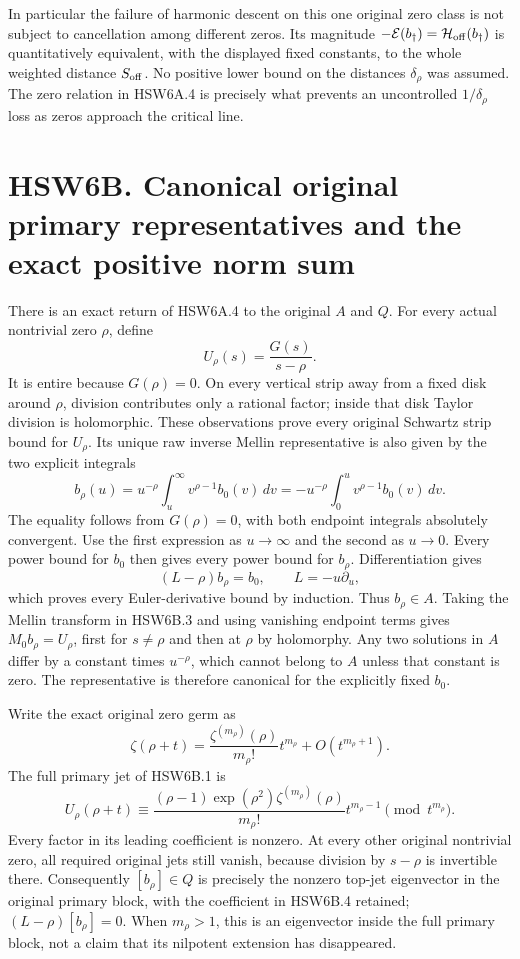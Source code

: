 In particular the failure of harmonic descent on this one original zero
class is not subject to cancellation among different zeros. Its
magnitude \(-\mathcal E(b_\dagger)=\mathcal H_{\rm off}(b_\dagger)\) is
quantitatively equivalent, with the displayed fixed constants, to the
whole weighted distance \(S_{\rm off}\). No positive lower bound on the
distances \(\delta_\rho\) was assumed. The zero relation in HSW6A.4 is
precisely what prevents an uncontrolled \(1/\delta_\rho\) loss as zeros
approach the critical line.

\section{HSW6B. Canonical original primary representatives and the exact
positive norm
sum}\label{hsw6b.-canonical-original-primary-representatives-and-the-exact-positive-norm-sum}

There is an exact return of HSW6A.4 to the original \(A\) and \(Q\). For
every actual nontrivial zero \(\rho\), define \[
U_\rho(s)=\frac{G(s)}{s-\rho}.
\tag{HSW6B.1}
\] It is entire because \(G(\rho)=0\). On every vertical strip away from
a fixed disk around \(\rho\), division contributes only a rational
factor; inside that disk Taylor division is holomorphic. These
observations prove every original Schwartz strip bound for \(U_\rho\).
Its unique raw inverse Mellin representative is also given by the two
explicit integrals \[
\boxed{
b_\rho(u)=u^{-\rho}\int_u^\infty v^{\rho-1}b_0(v)\,dv
=-u^{-\rho}\int_0^u v^{\rho-1}b_0(v)\,dv.}
\tag{HSW6B.2}
\] The equality follows from \(G(\rho)=0\), with both endpoint integrals
absolutely convergent. Use the first expression as \(u\to\infty\) and
the second as \(u\to0\). Every power bound for \(b_0\) then gives every
power bound for \(b_\rho\). Differentiation gives \[
(L-\rho)b_\rho=b_0,\qquad L=-u\partial_u,
\tag{HSW6B.3}
\] which proves every Euler-derivative bound by induction. Thus
\(b_\rho\in A\). Taking the Mellin transform in HSW6B.3 and using
vanishing endpoint terms gives \(M_0b_\rho=U_\rho\), first for
\(s\ne\rho\) and then at \(\rho\) by holomorphy. Any two solutions in
\(A\) differ by a constant times \(u^{-\rho}\), which cannot belong to
\(A\) unless that constant is zero. The representative is therefore
canonical for the explicitly fixed \(b_0\).

Write the exact original zero germ as \[
\zeta(\rho+t)=\frac{\zeta^{(m_\rho)}(\rho)}{m_\rho!}t^{m_\rho}
+O(t^{m_\rho+1}).
\] The full primary jet of HSW6B.1 is \[
U_\rho(\rho+t)\equiv
\frac{(\rho-1)\exp(\rho^2)\zeta^{(m_\rho)}(\rho)}{m_\rho!}
t^{m_\rho-1}
\pmod{t^{m_\rho}}.
\tag{HSW6B.4}
\] Every factor in its leading coefficient is nonzero. At every other
original nontrivial zero, all required original jets still vanish,
because division by \(s-\rho\) is invertible there. Consequently
\([b_\rho]\in Q\) is precisely the nonzero top-jet eigenvector in the
original primary block, with the coefficient in HSW6B.4 retained;
\((L-\rho)[b_\rho]=0\). When \(m_\rho>1\), this is an eigenvector inside
the full primary block, not a claim that its nilpotent extension has
disappeared.

